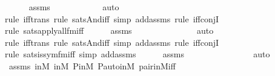 \begin{isabellebody}
\ \ \ \ \isamarkupfalse%
\ assms\isanewline
\ \ \ \ \ \ \ \ \ \ \isamarkupfalse%
\ auto{\isacharbrackleft}{\kern0pt}{}{\isacharbrackright}{\kern0pt}\isanewline
\ \ \ \ \ \isamarkupfalse%
{\isacharparenleft}{\kern0pt}rule\ iff{\isacharunderscore}{\kern0pt}trans{\isacharcomma}{\kern0pt}\ rule\ sats{\isacharunderscore}{\kern0pt}And{\isacharunderscore}{\kern0pt}iff{\isacharcomma}{\kern0pt}\ simp\ add{\isacharcolon}{\kern0pt}assms{\isacharcomma}{\kern0pt}\ rule\ iff{\isacharunderscore}{\kern0pt}conjI{}{\isacharparenright}{\kern0pt}\isanewline
\ \ \ \ \ \ \isamarkupfalse%
{\isacharparenleft}{\kern0pt}rule\ sats{\isacharunderscore}{\kern0pt}apply{\isacharunderscore}{\kern0pt}all{\isacharunderscore}{\kern0pt}{}{\isacharunderscore}{\kern0pt}fm{\isacharunderscore}{\kern0pt}iff{\isacharparenright}{\kern0pt}\isanewline
\ \ \ \ \isamarkupfalse%
\ assms\ \isanewline
\ \ \ \ \ \ \ \ \ \ \ \ \isamarkupfalse%
\ auto{\isacharbrackleft}{\kern0pt}{}{\isacharbrackright}{\kern0pt}\isanewline
\ \ \ \ \ \isamarkupfalse%
{\isacharparenleft}{\kern0pt}rule\ iff{\isacharunderscore}{\kern0pt}trans{\isacharcomma}{\kern0pt}\ rule\ sats{\isacharunderscore}{\kern0pt}And{\isacharunderscore}{\kern0pt}iff{\isacharcomma}{\kern0pt}\ simp\ add{\isacharcolon}{\kern0pt}assms{\isacharcomma}{\kern0pt}\ rule\ iff{\isacharunderscore}{\kern0pt}conjI{}{\isacharparenright}{\kern0pt}\isanewline
\ \ \ \ \ \ \isamarkupfalse%
{\isacharparenleft}{\kern0pt}rule\ sats{\isacharunderscore}{\kern0pt}is{\isacharunderscore}{\kern0pt}sym{\isacharunderscore}{\kern0pt}fm{\isacharunderscore}{\kern0pt}iff{\isacharcomma}{\kern0pt}\ simp\ add{\isacharcolon}{\kern0pt}assms{\isacharparenright}{\kern0pt}\isanewline
\ \ \ \ \isamarkupfalse%
\ assms\isanewline
\ \ \ \ \ \ \ \ \ \ \ \ \ \ \isamarkupfalse%
\ auto{\isacharbrackleft}{\kern0pt}{}{}{\isacharbrackright}{\kern0pt}\isanewline
\ \ \ \ \isamarkupfalse%
\ assms\ {\isasymF}{\isacharunderscore}{\kern0pt}in{\isacharunderscore}{\kern0pt}M\ {\isasymG}{\isacharunderscore}{\kern0pt}in{\isacharunderscore}{\kern0pt}M\ P{\isacharunderscore}{\kern0pt}in{\isacharunderscore}{\kern0pt}M\ P{\isacharunderscore}{\kern0pt}auto{\isacharunderscore}{\kern0pt}in{\isacharunderscore}{\kern0pt}M\ pair{\isacharunderscore}{\kern0pt}in{\isacharunderscore}{\kern0pt}M{\isacharunderscore}{\kern0pt}iff\ \isanewline
\ \ \ \ \isamarkupfalse%

\end{isabellebody}
